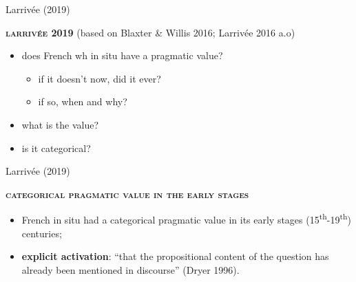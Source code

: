 \documentclass[lesson_slides]{subfiles}
\begin{document}
\begin{frame}[c]{Larrivée (2019)}

    \noindent \textbf{\textsc{larrivée 2019}} \pause (based on Blaxter \& Willis 2016; Larrivée 2016 a.o) \pause
    \begin{itemize}
        \item[\ding{227}] does French wh in situ have a pragmatic value? \pause
        \begin{itemize}
            \item if it doesn’t now, did it ever?
            \item if so, when and why?
        \end{itemize}
        \item[\ding{227}] what is the value? \pause
        \item[\ding{227}] is it categorical?
    \end{itemize}
  
\end{frame}
\begin{frame}[c]{Larrivée (2019)}

    \noindent \textbf{\textsc{categorical pragmatic value in the early stages}} \pause
    \begin{itemize}
        \item[\ding{227}] French in situ had a categorical pragmatic value in its early stages (15\textsuperscript{th}-19\textsuperscript{th}) centuries; \pause
        \item[\ding{227}] \textbf{explicit activation}: \pause “that the propositional content of the question has already been mentioned in discourse” (Dryer 1996).\\ \pause
        
    \end{itemize}
  
\end{frame}
\end{document}
